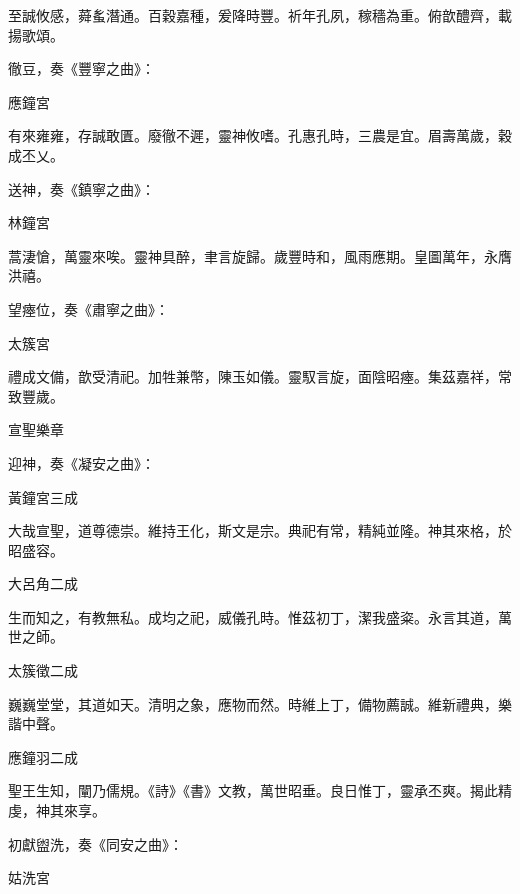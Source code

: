 \begin{pinyinscope}
 至誠攸感，蕣蚃潛通。百穀嘉種，爰降時豐。祈年孔夙，稼穡為重。俯歆醴齊，載揚歌頌。



 徹豆，奏《豐寧之曲》：



 應鐘宮



 有來雍雍，存誠敢匱。廢徹不遲，靈神攸嗜。孔惠孔時，三農是宜。眉壽萬歲，穀成丕乂。



 送神，奏《鎮寧之曲》：



 林鐘宮


 蒿淒愴，萬靈來唉。靈神具醉，聿言旋歸。歲豐時和，風雨應期。皇圖萬年，永膺洪禧。



 望瘞位，奏《肅寧之曲》：



 太簇宮



 禮成文備，歆受清祀。加牲兼幣，陳玉如儀。靈馭言旋，面陰昭瘞。集茲嘉祥，常致豐歲。



 宣聖樂章



 迎神，奏《凝安之曲》：



 黃鐘宮三成



 大哉宣聖，道尊德崇。維持王化，斯文是宗。典祀有常，精純並隆。神其來格，於昭盛容。



 大呂角二成



 生而知之，有教無私。成均之祀，威儀孔時。惟茲初丁，潔我盛粢。永言其道，萬世之師。



 太簇徵二成



 巍巍堂堂，其道如天。清明之象，應物而然。時維上丁，備物薦誠。維新禮典，樂諧中聲。



 應鐘羽二成



 聖王生知，闡乃儒規。《詩》《書》文教，萬世昭垂。良日惟丁，靈承丕爽。揭此精虔，神其來享。



 初獻盥洗，奏《同安之曲》：



 姑洗宮




\end{pinyinscope}
